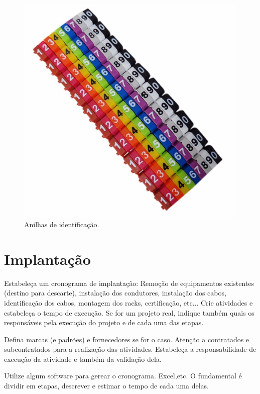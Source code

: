 \documentclass[	DIV=calc,%
							paper=a4,%
							fontsize=12pt,%
							onecolumn]{scrartcl}	 					%
\begin{document}
\begin{figure}[!htbp]
	\centering
	\includegraphics[width=\textwidth]{./imagens/identificador-de-cabos-anilhas.png}
	\caption{Anilhas de identificação.}
	\label{RV Cabeamento Estruturado}
	\label{fig:anilhas_identificacao}
\end{figure} 

\section{Implantação}
Estabeleça um cronograma de implantação:
Remoção de equipamentos existentes (destino para descarte), instalação dos condutores, instalação dos cabos, 
identificação dos cabos, montagem dos racks, certificação, etc... Crie atividades e estabeleça o tempo de execução. Se for um projeto real, indique também quais os responsáveis pela execução do projeto e de cada uma das etapas.

Defina marcas (e padrões) e fornecedores se for o caso. Atenção a contratados e subcontratados para a realização das atividades. Estabeleça a responsabilidade de execução da atividade e também da validação dela.

Utilize algum software para gerear o cronograma. Excel,etc. O fundamental é dividir em etapas, descrever e estimar o tempo de cada uma delas.
\end{document}
